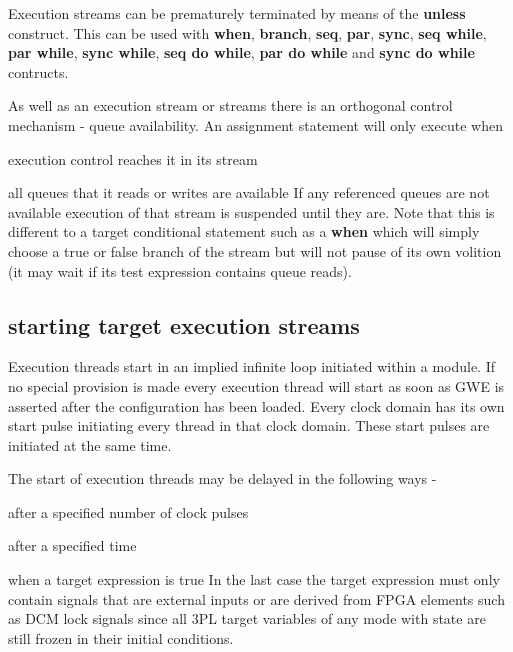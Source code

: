             Execution streams can be prematurely terminated by means of the {\bf
            unless} construct. This can be used with {\bf when}, {\bf branch}, {\bf
            seq}, {\bf par}, {\bf sync}, {\bf seq while}, {\bf par while}, {\bf sync
            while}, {\bf seq do while}, {\bf par do while} and {\bf sync do while}
            contructs.

            As well as an execution stream or streams there is an
            orthogonal control mechanism - queue availability. An assignment
            statement will only execute when
            \blist
            \item   execution control reaches it in its stream
            \item   all queues that it reads or writes are available
            \blend
            If any referenced queues are not available execution of that
            stream is suspended until they are. Note that this is different
            to a target conditional statement such as a {\bf when} which will
            simply choose a true or false branch of the stream but will
            not pause of its own volition (it may wait if its test expression
            contains queue reads).
        
        
        \subsection{starting target execution streams}
        

            Execution threads start in an implied infinite loop initiated within
            a module. If no special provision is made every execution thread will
            start as soon as GWE is asserted after the configuration has been
            loaded. Every clock domain has its own start pulse initiating every
            thread in that clock domain. These start pulses are initiated at the
            same time.
            
            The start of execution threads may be delayed in the
            following ways -
            \blist
            \item   after a specified number of clock pulses
            \item   after a specified time
            \item   when a target expression is true
            \blend
            In the last case the target expression must only contain signals
            that are external inputs or are derived from FPGA elements such
            as DCM lock signals since all 3PL target variables of any mode
            with state are still frozen in their initial conditions.
            
